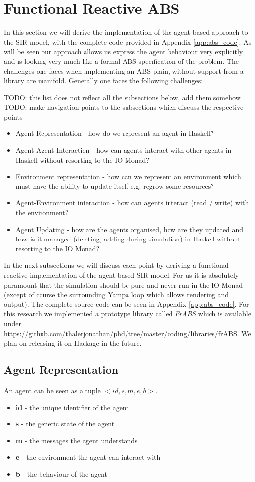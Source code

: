 \section{Functional Reactive ABS}
In this section we will derive the implementation of the agent-based approach to the SIR model, with the complete code provided in Appendix \ref{app:abs_code}. As will be seen our approach allows us express the agent behaviour very explicitly and is looking very much like a formal ABS specification of the problem. The challenges one faces when implementing an ABS plain, without support from a library are manifold. Generally one faces the following challenges:

TODO: this list does not reflect all the subsections below, add them somehow
TODO: make navigation points to the subsections which discuss the respective points

\begin{itemize}
	\item Agent Representation - how do we represent an agent in Haskell?
	\item Agent-Agent Interaction - how can agents interact with other agents in Haskell without resorting to the IO Monad?
	\item Environment representation - how can we represent an environment which must have the ability to update itself e.g. regrow some resources?
	\item Agent-Environment interaction - how can agents interact (read / write) with the environment?
	\item Agent Updating - how are the agents organised, how are they updated and how is it managed (deleting, adding during simulation) in Haskell without resorting to the IO Monad?
\end{itemize}

In the next subsections we will discuss each point by deriving a functional reactive implementation of the agent-based SIR model. For us it is absolutely paramount that the simulation should be pure and never run in the IO Monad (except of course the surrounding Yampa loop which allows rendering and output). The complete source-code can be seen in Appendix \ref{app:abs_code}. For this research we implemented a prototype library called \textit{FrABS} which is available under \url{https://github.com/thalerjonathan/phd/tree/master/coding/libraries/frABS}. We plan on releasing it on Hackage in the future.

\subsection{Agent Representation}
An agent can be seen as a tuple $<id, s, m, e, b>$.
\begin{itemize}
	\item \textbf{id} - the unique identifier of the agent
	\item \textbf{s} - the generic state of the agent
	\item \textbf{m} - the messages the agent understands
	\item \textbf{e} - the environment the agent can interact with
	\item \textbf{b} - the behaviour of the agent
\end{itemize}

